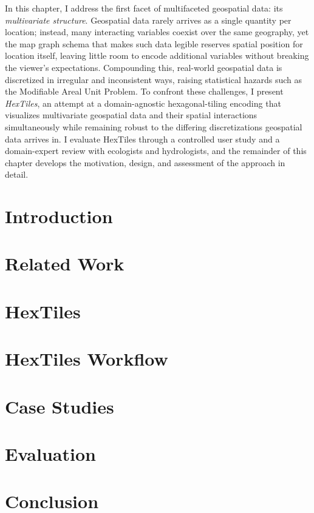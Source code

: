 In this chapter, I address the first facet of multifaceted geospatial data: its \emph{multivariate structure}.
%
Geospatial data rarely arrives as a single quantity per location; instead, many interacting variables coexist over the same geography, yet the map graph schema that makes such data legible reserves spatial position for location itself, leaving little room to encode additional variables without breaking the viewer's expectations.
%
Compounding this, real-world geospatial data is discretized in irregular and inconsistent ways, raising statistical hazards such as the Modifiable Areal Unit Problem.
%
To confront these challenges, I present \emph{HexTiles}, an attempt at a domain-agnostic hexagonal-tiling encoding that visualizes multivariate geospatial data and their spatial interactions simultaneously while remaining robust to the differing discretizations geospatial data arrives in.
%
I evaluate HexTiles through a controlled user study and a domain-expert review with ecologists and hydrologists, and the remainder of this chapter develops the motivation, design, and assessment of the approach in detail.
\section{Introduction}\label{sec:intro}

\section{Related Work}\label{sec:relworks}

\section{HexTiles}\label{sec:methods}

\section{HexTiles Workflow}\label{sec:workflow}

\section{Case Studies}\label{sec:cases}

\section{Evaluation}\label{sec:feedback}

\section{Conclusion}\label{sec:conclusion}

